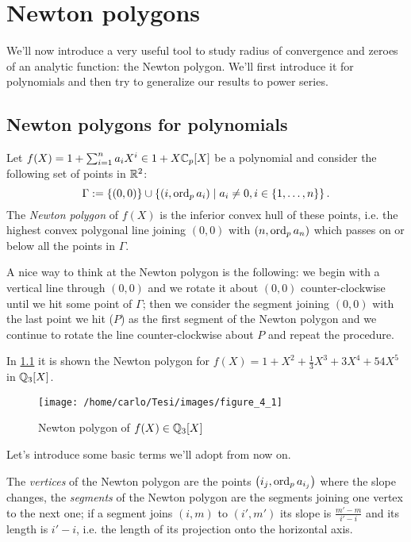 \chapter{Newton polygons}
	We'll now introduce a very useful tool to study radius of convergence and zeroes of an analytic function: the Newton polygon. We'll first introduce it for polynomials and then try to generalize our results to power series.
	\section{Newton polygons for polynomials}
		\begin{defn}
			\label{defn:newton-polygon-polynomials}
			Let $f(X) = 1 + \sum_{i=1}^n a_iX^i \in 1 + X\mathbb{C}_p[X]$ be a polynomial and consider the following set of points in $\mathbb{R}^2$:
			\[
			\Gamma := \{(0,0)\} \cup \left\{(i, \textrm{ord}_p\, a_i) \mid a_i \neq 0, i \in \{1, \dots, n\}\right\}.
			\]
			The \emph{Newton polygon} of $f(X)$ is the inferior convex hull of these points, i.e. the highest convex polygonal line joining $(0, 0)$ with $(n, \textrm{ord}_p\, a_n)$ which passes on or below all the points in $\Gamma$.
		\end{defn}
		A nice way to think at the Newton polygon is the following: we begin with a vertical line through $(0,0)$ and we rotate it about $(0,0)$ counter-clockwise until we hit some point of $\Gamma$; then we consider the segment joining $(0,0)$ with the last point we hit ($P$) as the first segment of the Newton polygon and we continue to rotate the line counter-clockwise about $P$ and repeat the procedure.
		\begin{example}
			In \cref{figure:figure4.1} it is shown the Newton polygon for $f(X) = 1 + X^2 + \tfrac{1}{3}X^3 + 3X^4 + 54X^5$ in $\mathbb{Q}_3[X]$. 
			\begin{figure}
				\centering 
				\texttt{[image: /home/carlo/Tesi/images/figure\_4\_1]}
				\caption{Newton polygon of $f(X) \in \mathbb{Q}_3[X]$}
				\label{figure:figure4.1}
			\end{figure}
		\end{example}
		Let's introduce some basic terms we'll adopt from now on.
		\begin{defn}
			The \emph{vertices} of the Newton polygon are the points $\left(i_j, \textrm{ord}_p\, a_{i_j}\right)$ where the slope changes, the \emph{segments} of the Newton polygon are the segments joining one vertex to the next one; if a segment joins $(i, m)$ to $(i', m')$ its slope is $\tfrac{m' - m}{i' -i}$ and its length is $i' - i$, i.e. the length of its projection onto the horizontal axis.
		\end{defn}
